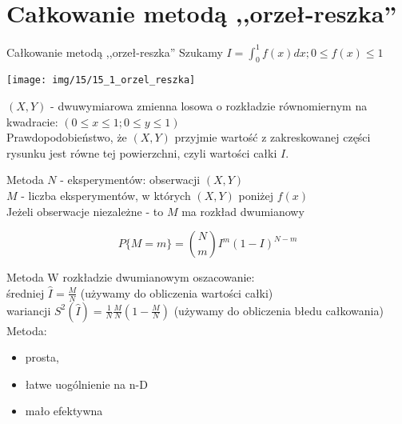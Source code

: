 \section{Całkowanie metodą ,,orzeł-reszka''}
\begin{frame}{Całkowanie metodą ,,orzeł-reszka''}
	Szukamy $I = \int_0^1 f(x) dx; 0 \le f(x) \le 1$
    
    {\centering 
    	\texttt{[image: img/15/15\_1\_orzel\_reszka]}
        \par
    }
    
    $(X, Y)$ - dwuwymiarowa zmienna losowa o rozkładzie równomiernym na kwadracie: $(0 \le x \le 1; 0 \le y \le 1)$ \\
    Prawdopodobieństwo, że $(X, Y)$ przyjmie wartość z zakreskowanej części rysunku jest równe tej powierzchni, czyli wartości całki $I$.
\end{frame}
\begin{frame}{Metoda}
	$N$ - eksperymentów: obserwacji $(X, Y)$ \\
    $M$ - liczba eksperymentów, w których $(X, Y)$ poniżej $f(x)$
    \\[8pt]
    Jeżeli obserwacje niezależne - to $M$ ma rozkład dwumianowy
    
    \[\boxed{
    	P\{M = m\} = \left.
            \binom{N}{m}
        \right. I^m (1-I)^{N-m}
    }\]
\end{frame}
\begin{frame}{Metoda}
	W rozkładzie dwumianowym oszacowanie:\\
    średniej  $\hat{I} = \frac{M}{N}$ (używamy do obliczenia wartości całki)\\
    wariancji  $S^2(\hat{I}) = \frac{1}{N} \frac{M}{N} \left( 
    	1 - \frac{M}{N}
    \right)$  (używamy do obliczenia błedu całkowania)
    \\[8pt]
    Metoda:
    \begin{itemize}
    	\item prosta,
        \item łatwe uogólnienie na n-D
        \item mało efektywna
    \end{itemize}
\end{frame}